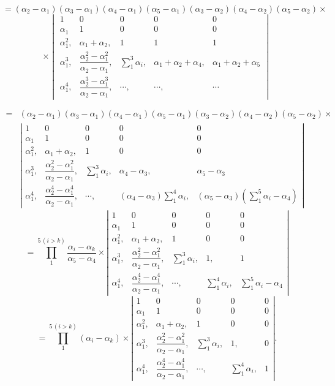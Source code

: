 \[
= (\alpha_2-\alpha_1)(\alpha_3-\alpha_1)(\alpha_4-\alpha_1)(\alpha_5-\alpha_1)(\alpha_3-\alpha_2)(\alpha_4-\alpha_2)(\alpha_5-\alpha_2) \times
\]
\[
\times \begin{vmatrix}
1 & 0 & 0 & 0 & 0\\
\alpha_1 & 1 & 0 & 0 & 0\\
\alpha_1^2, & \alpha_1+\alpha_2, & 1 & 1 & 1\\
\alpha_1^3, & \dfrac{\alpha_2^2-\alpha_1^2}{\alpha_2-\alpha_1}, & \displaystyle\sum_{1}^{3}\alpha_i, & \alpha_1+\alpha_2+\alpha_4, & \alpha_1+\alpha_2+\alpha_5\\
\alpha_1^4, & \dfrac{\alpha_2^3-\alpha_1^3}{\alpha_2-\alpha_1}, & \cdots, & \cdots, & \cdots
\end{vmatrix}
\]


{\footnotesize
\[
\begin{aligned}
={}& (\alpha_2-\alpha_1)(\alpha_3-\alpha_1)(\alpha_4-\alpha_1)(\alpha_5-\alpha_1)(\alpha_3-\alpha_2)(\alpha_4-\alpha_2)(\alpha_5-\alpha_2) \times\\
&
\left|
\begin{array}{lllll}
1 & 0 & 0 & 0 & 0 \\
\alpha_1 & 1 & 0 & 0 & 0 \\
\alpha_1^2, & \alpha_1+\alpha_2, & 1 & 0 & 0 \\
\alpha_1^3, & \dfrac{\alpha_2^2-\alpha_1^2}{\alpha_2-\alpha_1}, & \displaystyle\sum_1^3\alpha_i, & \alpha_4-\alpha_3, & \alpha_5-\alpha_3 \\
\alpha_1^4, & \dfrac{\alpha_2^4-\alpha_1^4}{\alpha_2-\alpha_1}, & \cdots, & (\alpha_4-\alpha_3)\displaystyle\sum_1^4\alpha_i, & (\alpha_5-\alpha_3)\left(\displaystyle\sum_1^5\alpha_i-\alpha_4\right)
\end{array}
\right|
\end{aligned}
\]
}
\[
= \prod_1^{5\,(i>k)} \frac{\alpha_i-\alpha_k}{\alpha_5-\alpha_4} \times
\left|
\begin{array}{lllll}
1 & 0 & 0 & 0 & 0 \\
\alpha_1 & 1 & 0 & 0 & 0 \\
\alpha_1^2, & \alpha_1+\alpha_2, & 1 & 0 & 0 \\
\alpha_1^3, & \dfrac{\alpha_2^2-\alpha_1^2}{\alpha_2-\alpha_1}, & \displaystyle\sum_1^3\alpha_i, & 1, & 1 \\
\alpha_1^4, & \dfrac{\alpha_2^4-\alpha_1^4}{\alpha_2-\alpha_1}, & \cdots, & \displaystyle\sum_1^4\alpha_i, & \displaystyle\sum_1^5\alpha_i-\alpha_4
\end{array}
\right|
\]
\[
= \prod_1^{5\,(i>k)} (\alpha_i-\alpha_k) \times
\left|
\begin{array}{lllll}
1 & 0 & 0 & 0 & 0 \\
\alpha_1 & 1 & 0 & 0 & 0 \\
\alpha_1^2, & \alpha_1+\alpha_2, & 1 & 0 & 0 \\
\alpha_1^3, & \dfrac{\alpha_2^2-\alpha_1^2}{\alpha_2-\alpha_1}, & \displaystyle\sum_1^3\alpha_i, & 1, & 0 \\
\alpha_1^4, & \dfrac{\alpha_2^4-\alpha_1^4}{\alpha_2-\alpha_1}, & \cdots, & \displaystyle\sum_1^4\alpha_i, & 1
\end{array}
\right|.
\]

